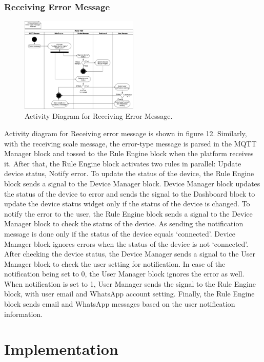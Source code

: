 \documentclass[conference]{IEEEtran}
\begin{document}
\subsubsection{Receiving Error Message}
\begin{figure}[htbp]
\centerline{\includegraphics[width=0.5\textwidth]{./images/errorMessageReceived.png}}
\caption{Activity Diagram for Receiving Error Message.}
\label{fig}
\end{figure}
Activity diagram for Receiving error message is shown in figure 12. Similarly, with the receiving scale message, the error-type message is parsed in the MQTT Manager block and tossed to the Rule Engine block when the platform receives it. After that, the Rule Engine block activates two rules in parallel: Update device status, Notify error. To update the status of the device, the Rule Engine block sends a signal to the Device Manager block. Device Manager block updates the status of the device to error and sends the signal to the Dashboard block to update the device status widget only if the status of the device is changed. To notify the error to the user, the Rule Engine block sends a signal to the Device Manager block to check the status of the device. As sending the notification message is done only if the status of the device equals ‘connected’. Device Manager block ignores errors when the status of the device is not ‘connected’. After checking the device status, the Device Manager sends a signal to the User Manager block to check the user setting for notification. In case of the notification being set to 0, the User Manager block ignores the error as well. When notification is set to 1, User Manager sends the signal to the Rule Engine block, with user email and WhatsApp account setting. Finally, the Rule Engine block sends email and WhatsApp messages based on the user notification information.

\section{Implementation}
\end{document}
